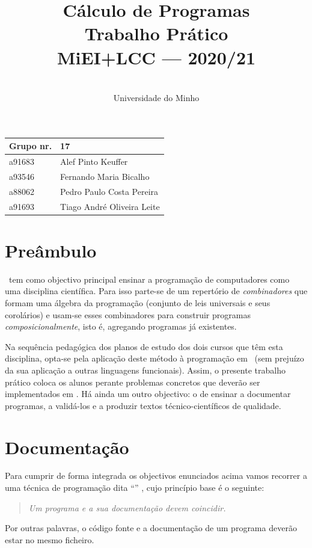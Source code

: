 \documentclass[a4paper]{article}
\title{
       	Cálculo de Programas
\\
       	Trabalho Prático
\\
       	MiEI+LCC --- 2020/21
}
\author{
       	\dium
\\
       	Universidade do Minho
}
\date\mydate
\begin{document}
\maketitle

\begin{center}\large
\begin{tabular}{ll}
\textbf{Grupo} nr. & 17
\\\hline
a91683 & Alef Pinto Keuffer
\\
a93546 & Fernando Maria Bicalho
\\
a88062 & Pedro Paulo Costa Pereira
\\
a91693 & Tiago André Oliveira Leite
\end{tabular}
\end{center}

\section{Preâmbulo}

\CP\ tem como objectivo principal ensinar
a progra\-mação de computadores como uma disciplina científica. Para isso
parte-se de um repertório de \emph{combinadores} que formam uma álgebra da
programação (conjunto de leis universais e seus corolários) e usam-se esses
combinadores para construir programas \emph{composicionalmente}, isto é,
agregando programas já existentes.

Na sequência pedagógica dos planos de estudo dos dois cursos que têm
esta disciplina, opta-se pela aplicação deste método à programação
em \Haskell\ (sem prejuízo da sua aplicação a outras linguagens
funcionais). Assim, o presente trabalho prático coloca os
alunos perante problemas concretos que deverão ser implementados em
\Haskell.  Há ainda um outro objectivo: o de ensinar a documentar
programas, a validá-los e a produzir textos técnico-científicos de
qualidade.

\section{Documentação} Para cumprir de forma integrada os objectivos
enunciados acima vamos recorrer a uma técnica de programa\-ção dita
``'' \cite{Kn92}, cujo princípio base é o seguinte:
%
\begin{quote}\em Um programa e a sua documentação devem coincidir.
\end{quote}
%
Por outras palavras, o código fonte e a documentação de um
programa deverão estar no mesmo ficheiro.
\end{document}
